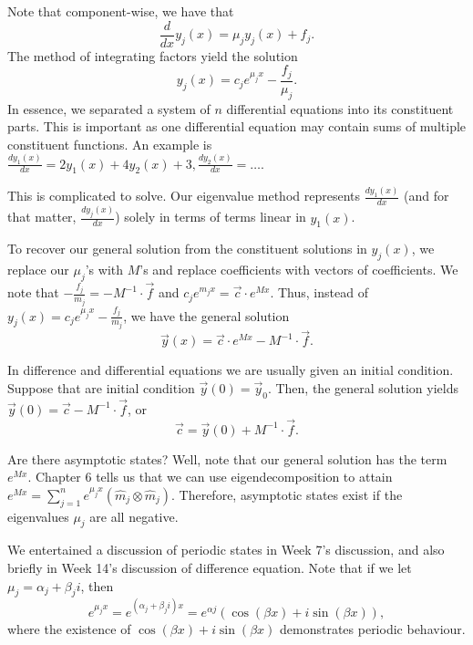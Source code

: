 \documentclass[a4paper, 12pt,oneside,openany]{book}
\begin{document}
Note that component-wise, we have that $$\frac{d}{dx} y_j(x) = \mu_j y_j(x)+f_j.$$ The method of integrating factors yield the solution $$y_j(x) = c_j e^{\mu_j x}-\frac{f_j}{\mu_j}.$$ In essence, we separated a system of $n$ differential equations into its constituent parts. This is important as one differential equation may contain sums of multiple constituent functions. An example is $\frac{dy_1(x)}{dx} = 2y_1(x)+4y_2(x)+3, \frac{dy_2(x)}{dx}=\dots.$

This is complicated to solve. Our eigenvalue method represents $\frac{dy_1(x)}{dx}$ (and for that matter, $\frac{dy_j(x)}{dx}$) solely in terms of terms linear in $y_1(x)$. 

To recover our general solution from the constituent solutions in $y_j(x)$, we replace our $\mu_j$'s with $M$'s and replace coefficients with vectors of coefficients. We note that $-\frac{f_j}{m_j} = -M^{-1} \cdot \vec{f}$ and $c_j e^{m_j x} = \vec{c} \cdot e^{Mx}$. Thus, instead of $y_j(x) = c_j e^{\mu_j x}-\frac{f_j}{m_j}$, we have the general solution $$\vec{y}(x) = \vec{c}  \cdot e^{Mx} - M^{-1} \cdot \vec{f}.$$

In difference and differential equations we are usually given an initial condition. Suppose that are initial condition $\vec{y}(0)=\vec{y}_0$. Then, the general solution yields $\vec{y}(0) = \vec{c} - M^{-1} \cdot \vec{f}$, or $$\vec{c} = \vec{y}(0)+M^{-1} \cdot \vec{f}.$$

Are there asymptotic states? Well, note that our general solution has the term $e^{Mx}$. Chapter 6 tells us that we can use eigendecomposition to attain $e^{Mx}=\sum\limits_{j=1}^n e^{\mu_j x} (\hat{m}_j \otimes \hat{m}_j)$. Therefore, asymptotic states exist if the eigenvalues $\mu_j$ are all negative.

We entertained a discussion of periodic states in Week 7's discussion, and also briefly in Week 14's discussion of difference equation. Note that if we let $\mu_j = \alpha_j + \beta_j i$, then $$e^{\mu_j x} = e^{(\alpha_j + \beta_ji)x} = e^{\alpha j} (\cos (\beta x)+i \sin (\beta x)),$$ where the existence of $\cos (\beta x)+i \sin (\beta x)$ demonstrates periodic behaviour.
\end{document}
